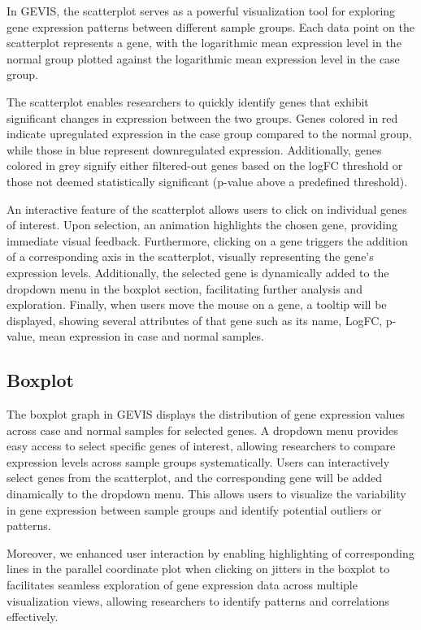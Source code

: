 \documentclass[
	a4paper, %
	10pt, %
	unnumberedsections, %
	twoside, %
]{LTJournalArticle}
\begin{document}
In GEVIS, the scatterplot serves as a powerful visualization tool for exploring gene expression patterns between different sample groups. Each data point on the scatterplot represents a gene, with the logarithmic mean expression level in the normal group plotted against the logarithmic mean expression level in the case group.

The scatterplot enables researchers to quickly identify genes that exhibit significant changes in expression between the two groups. Genes colored in red indicate upregulated expression in the case group compared to the normal group, while those in blue represent downregulated expression. Additionally, genes colored in grey signify either filtered-out genes based on the logFC threshold or those not deemed statistically significant (p-value above a predefined threshold).

An interactive feature of the scatterplot allows users to click on individual genes of interest. Upon selection, an animation highlights the chosen gene, providing immediate visual feedback. Furthermore, clicking on a gene triggers the addition of a corresponding axis in the scatterplot, visually representing the gene's expression levels. Additionally, the selected gene is dynamically added to the dropdown menu in the boxplot section, facilitating further analysis and exploration. Finally, when users move the mouse on a gene, a tooltip will be displayed, showing several attributes of that gene such as its name, LogFC, p-value, mean expression in case and normal samples.

\subsection{Boxplot}

The boxplot graph in GEVIS displays the distribution of gene expression values across case and normal samples for selected genes. A dropdown menu provides easy access to select specific genes of interest, allowing researchers to compare expression levels across sample groups systematically. Users can interactively select genes from the scatterplot, and the corresponding gene will be added dinamically to the dropdown menu. This allows users to visualize the variability in gene expression between sample groups and identify potential outliers or patterns.

Moreover, we enhanced user interaction by enabling highlighting of corresponding lines in the parallel coordinate plot when clicking on jitters in the boxplot to facilitates seamless exploration of gene expression data across multiple visualization views, allowing researchers to identify patterns and correlations effectively.
\end{document}
